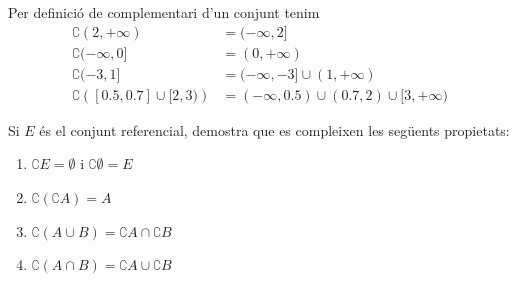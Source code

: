 \begin{solucio}
Per definició de complementari d'un conjunt tenim%
\begin{align*}
\complement (2,+\infty )& =(-\infty ,2] \\
\complement (-\infty ,0]& =(0,+\infty ) \\
\complement (-3,1]& =(-\infty ,-3]\cup (1,+\infty ) \\
\complement \left( [ 0.5,0.7]\cup [ 2,3)\right) & =(-\infty
,0.5)\cup (0.7,2)\cup [ 3,+\infty )
\end{align*}
\end{solucio}

\begin{exercici}
Si $E$ és el conjunt referencial, demostra que es compleixen les següents propietats:

\begin{enumerate}
\item $\complement E=\emptyset $ i $\complement \emptyset =E$

\item $\complement \left( \complement A\right) =A$

\item $\complement \left( A\cup B\right) =\complement A\cap \complement B$

\item $\complement \left( A\cap B\right) =\complement A\cup \complement B$
\end{enumerate}
\end{exercici}

